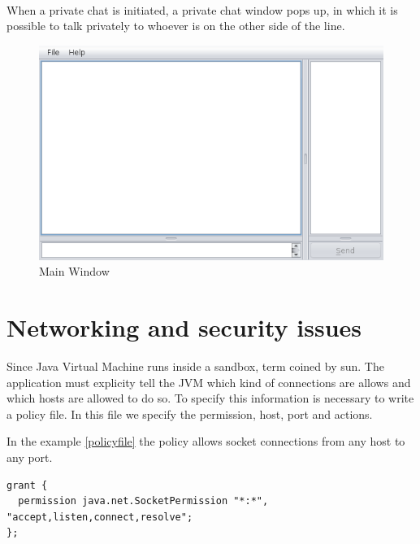 \documentclass[times, 8pt,twocolumn]{article}
\begin{document}
\paragraph{} When a private chat is initiated, a private chat window pops up, in which it is possible to talk privately to whoever is on the other side of the line.
\begin{figure} [H]
    \centering
    \includegraphics[scale=0.28]{img/mainscreen.png}
    \caption{Main Window} 
    \label{fig:papinho1}
\end{figure}
\section{Networking and security issues}
Since Java Virtual Machine runs inside a sandbox, term coined by sun. The application must explicity tell the JVM which kind of connections are allows and which hosts are allowed to do so.
To specify this information is necessary to write a policy file. In this file we specify the permission, host, port and actions. 

In the example \ref{policyfile} the policy allows socket connections from any host to any port. 

\begin{lstlisting}[caption={Policy file},label=policyfile]
grant {
  permission java.net.SocketPermission "*:*", "accept,listen,connect,resolve";
};
\end{lstlisting}
\end{document}
